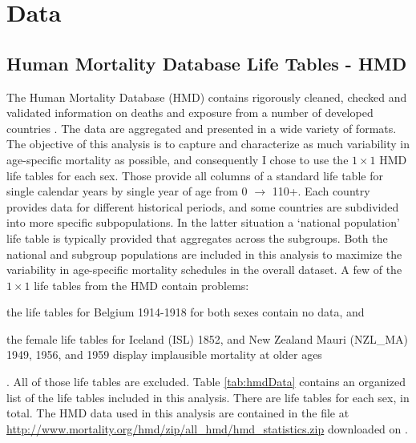 \documentclass[11pt]{article}
\newcommand{\note}[2][]{\added[#1,remark={#2}]{}}
\DeclareRobustCommand{\LTtot}{}
\DeclareRobustCommand{\LTtotBoth}{}
\DeclareRobustCommand{\HMDdate}{ \begingroup\endlinechar=-1 \endgroup}
\begin{document}
\section{Data}

\subsection{Human Mortality Database Life Tables - HMD}

The Human Mortality Database (HMD) \citep{hmd2016} contains rigorously cleaned, checked and validated information on deaths and exposure from a number of  developed countries .  The data are aggregated and presented in a wide variety of formats.  The objective of this analysis is to capture and characterize as much variability in age-specific mortality as possible, and consequently I chose to use the $1 \times 1$ HMD life tables for each sex.  Those provide all columns of a standard life table for single calendar years by single year of age from 0 $\rightarrow$ 110+.  Each country provides data for different historical periods, and some countries are subdivided into more specific subpopulations.  In the latter situation a `national population' life table is typically provided that aggregates across the subgroups.  Both the national and subgroup populations are included in this analysis to maximize the variability in age-specific mortality schedules in the overall dataset.  A few of the $1 \times 1$ life tables from the HMD contain problems: \note[id=note]{The excluded tables have been updated to reflect the updates in HMD through August 21, 2018.} 
\begin{enumerate*}[label=\arabic*)]
\item the life tables for Belgium 1914-1918 for both sexes contain no data, and
\item the female life tables for Iceland (ISL) 1852, and New Zealand Mauri (NZL\_MA) 1949, 1956, and 1959 display implausible mortality at older ages
\end{enumerate*}.  All of those life tables are excluded.  Table \ref{tab:hmdData} \note[id=note]{The format of this table was changed slightly to allow its contents to be generated and imported into the manuscript in an automated way.  The contents of the table are updated to reflect the most up-to-date HMD as of August 21, 2018.} contains an organized list of the life tables included in this analysis.  There are \LTtot life tables for each sex, \LTtotBoth in total.  The HMD data used in this analysis are contained in the file at \url{http://www.mortality.org/hmd/zip/all_hmd/hmd_statistics.zip} downloaded on \HMDdate.
\end{document}
